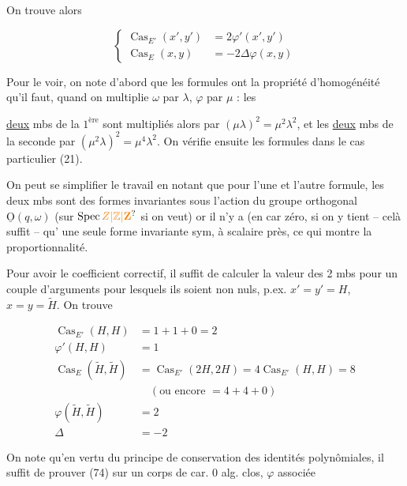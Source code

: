 On trouve alors

\[
\left\{\begin{aligned}
\operatorname{Cas}_{E'}(x',y')&=2\varphi'(x',y')\\
\operatorname{Cas}_E(x,y)&=-2\Delta\varphi(x,y)
\end{aligned}\right. \tag*{(74)}
\]

Pour le voir, on note d'abord que les  formules ont la propriété d'homogénéité qu'il faut, quand on multiplie $\omega$ par $\lambda$, $\varphi$ par $\mu$ : les

\uline{deux} mbs de la $1^{\mathrm{ère}}$ sont multipliés alors par $(\mu\lambda)^2=\mu^2\lambda^2$, et les \uline{deux} mbs de la seconde par $(\mu^2\lambda)^2=\mu^4\lambda^2$. On vérifie ensuite les formules dans le cas particulier (21).

On peut se simplifier le travail en notant que pour l'une et l'autre formule, les deux mbs sont des formes invariantes sous l'action du groupe  orthogonal $\underline{\mathrm O}(q,\omega)$ (sur $\operatorname{Spec}\unsure{Z|\mathbb Z|\mathbf Z}$ si on veut) or il n'y a (en car zéro, si on y tient -- celà suffit -- qu' une seule forme invariante sym, à scalaire près, ce qui montre la proportionnalité.

Pour avoir le coefficient correctif, il suffit de calculer la valeur des 2 mbs pour un couple d'arguments pour lesquels ils soient non nuls, p.ex. $x'=y'=H$, $x=y=\widetilde H$. On trouve

\[
\begin{aligned}
\operatorname{Cas}_{E'}(H,H)&=1+1+0=2\\
\varphi'(H,H)&=1\\
\operatorname{Cas}_E(\widetilde H,\widetilde H)
&=\operatorname{Cas}_{E'}(2H,2H)=4\operatorname{Cas}_{E'}(H,H)=8\\
&\quad(\text{ou encore }=4+4+0)\\
\varphi(\widetilde H,\widetilde H)&=2\\
\Delta&=-2
\end{aligned}
\]

On note qu'en vertu du  principe de conservation des identités polynômiales, il suffit de prouver (74) sur un corps de car. 0 alg. clos,   $\varphi$ associée

